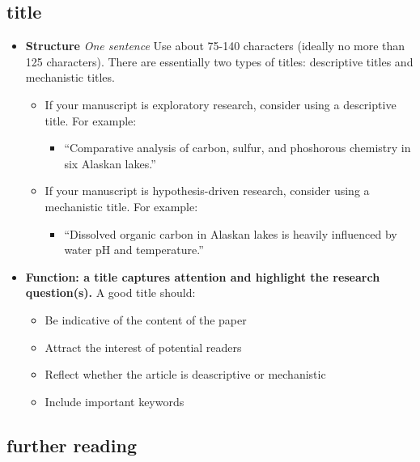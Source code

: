 \documentclass[
]{krantz}
\providecommand{\tightlist}{%
  \setlength{\itemsep}{0pt}\setlength{\parskip}{0pt}}
\begin{document}
\hypertarget{title}{%
\subsection{title}\label{title}}

\begin{itemize}
\tightlist
\item
  \textbf{Structure} \emph{One sentence} Use about 75-140 characters (ideally no more than 125 characters). There are essentially two types of titles: descriptive titles and mechanistic titles.

  \begin{itemize}
  \tightlist
  \item
    If your manuscript is exploratory research, consider using a descriptive title. For example:

    \begin{itemize}
    \tightlist
    \item
      ``Comparative analysis of carbon, sulfur, and phoshorous chemistry in six Alaskan lakes.''
    \end{itemize}
  \item
    If your manuscript is hypothesis-driven research, consider using a mechanistic title. For example:

    \begin{itemize}
    \tightlist
    \item
      ``Dissolved organic carbon in Alaskan lakes is heavily influenced by water pH and temperature.''
    \end{itemize}
  \end{itemize}
\item
  \textbf{Function: a title captures attention and highlight the research question(s).} A good title should:

  \begin{itemize}
  \tightlist
  \item
    Be indicative of the content of the paper
  \item
    Attract the interest of potential readers
  \item
    Reflect whether the article is deascriptive or mechanistic
  \item
    Include important keywords
  \end{itemize}
\end{itemize}

\hypertarget{further-reading-1}{%
\subsection{further reading}\label{further-reading-1}}
\end{document}
